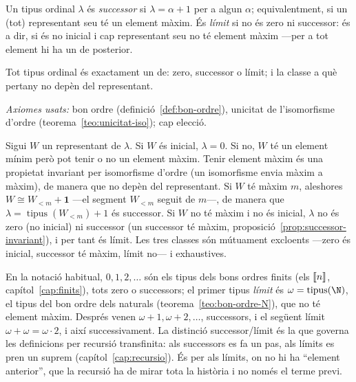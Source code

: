 \begin{definicio}\label{def:tipus-limit}
Un tipus ordinal \(\lambda\) és \emph{successor} si \(\lambda=\alpha+1\) per a
algun \(\alpha\); equivalentment, si un (tot) representant seu té un element
màxim. És \emph{límit} si no és zero ni successor: és a dir, si és no inicial i
cap representant seu no té element màxim ---per a tot element hi ha un de
posterior.
\end{definicio}

\begin{proposicio}\label{prop:tricotomia-successor}
Tot tipus ordinal és exactament un de: zero, successor o límit; i la classe a
què pertany no depèn del representant.\par
\emph{Axiomes usats:} bon ordre (definició~\ref{def:bon-ordre}), unicitat de
l'isomorfisme d'ordre (teorema~\ref{teo:unicitat-iso}); cap elecció.
\end{proposicio}

\begin{prova}
Sigui \(W\) un representant de \(\lambda\). Si \(W\) és inicial, \(\lambda=0\).
Si no, \(W\) té un element mínim però pot tenir o no un element màxim. Tenir
element màxim és una propietat invariant per isomorfisme d'ordre (un
isomorfisme envia màxim a màxim), de manera que no depèn del representant. Si
\(W\) té màxim \(m\), aleshores \(W\cong W_{<m}+\mathbf1\) ---el segment
\(W_{<m}\) seguit de \(m\)---, de manera que \(\lambda=\operatorname{tipus}(W_{<m})+1\)
és successor. Si \(W\) no té màxim i no és inicial, \(\lambda\) no és zero (no
inicial) ni successor (un successor té màxim, proposició~\ref{prop:successor-invariant}),
i per tant és límit. Les tres classes són mútuament excloents ---zero és
inicial, successor té màxim, límit no--- i exhaustives.
\end{prova}

\begin{observacio}\label{obs:limit-classic}
En la notació habitual, \(0,1,2,\dots\) són els tipus dels bons ordres finits
(els \(\llbracket n\rrbracket\), capítol~\ref{cap:finits}), tots zero o successors; el primer
tipus \emph{límit} és \(\omega=\operatorname{tipus}(\N)\), el tipus del bon
ordre dels naturals (teorema~\ref{teo:bon-ordre-N}), que no té element màxim.
Després venen \(\omega+1,\omega+2,\dots\), successors, i el següent límit
\(\omega+\omega=\omega\cdot2\), i així successivament. La distinció
successor/límit és la que governa les definicions per recursió transfinita:
als successors es fa un pas, als límits es pren un suprem
(capítol~\ref{cap:recursio}). És per als límits, on no hi ha \enquote{element
anterior}, que la recursió ha de mirar tota la història i no només el terme
previ.
\end{observacio}

